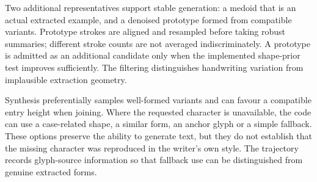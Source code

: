 \begin{designalgorithm}
\caption{Labelled handwriting to a persistent writer profile}
\label{alg:des-profile}
\begin{designpseudo}
\end{designpseudo}
\end{designalgorithm}

Two additional representatives support stable generation: a medoid that is an actual extracted example, and a denoised prototype formed from compatible variants. Prototype strokes are aligned and resampled before taking robust summaries; different stroke counts are not averaged indiscriminately. A prototype is admitted as an additional candidate only when the implemented shape-prior test improves sufficiently. The filtering distinguishes handwriting variation from implausible extraction geometry.

Synthesis preferentially samples well-formed variants and can favour a compatible entry height when joining. Where the requested character is unavailable, the code can use a case-related shape, a similar form, an anchor glyph or a simple fallback. These options preserve the ability to generate text, but they do not establish that the missing character was reproduced in the writer's own style. The trajectory records glyph-source information so that fallback use can be distinguished from genuine extracted forms.

